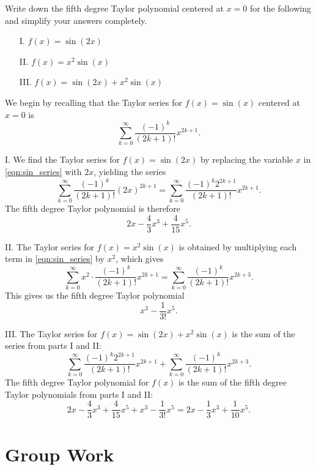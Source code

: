 \documentclass[]{ximera}
\begin{document}
\begin{problem} 
Write down the fifth degree Taylor polynomial centered at $x=0$ for the following and simplify your answers completely.  

\begin{itemize}
\item[I.]  $f(x) = \sin(2x)$
\item[II.] $f(x) = x^2 \sin(x)$
\item[III.] $f(x) = \sin(2x)+ x^2 \sin(x)$
\end{itemize}

\begin{solution}
We begin by recalling that the Taylor series for $f(x)=\sin(x)$ centered at $x=0$ is 
\begin{equation}\label{eqn:sin_series}
\sum_{k=0}^\infty \frac{(-1)^k}{(2k+1)!} x^{2k+1}.
\end{equation}

I. We find the Taylor series for $f(x) = \sin(2x)$ by replacing the variable $x$ in \eqref{eqn:sin_series} with $2x$, yielding the series
$$
\sum_{k=0}^\infty \frac{(-1)^k}{(2k+1)!} (2x)^{2k+1} = \sum_{k=0}^\infty \frac{(-1)^k2^{2k+1}}{(2k+1)!} x^{2k+1}.
$$
The fifth degree Taylor polynomial is therefore
$$
2x - \frac{4}{3}x^3 + \frac{4}{15} x^5.
$$

II. The Taylor series for $f(x) = x^2 \sin(x)$ is obtained by multiplying each term in \eqref{eqn:sin_series} by $x^2$, which gives
$$
\sum_{k=0}^\infty x^2 \cdot \frac{(-1)^k}{(2k+1)!} x^{2k+1} = \sum_{k=0}^\infty \frac{(-1)^k}{(2k+1)!} x^{2k+3}.
$$
This gives us the fifth degree Taylor polynomial
$$
x^3 - \frac{1}{3!} x^5.
$$

III. The Taylor series for $f(x) = \sin(2x)+ x^2 \sin(x)$ is the sum of the series from parts I and II:
$$
\sum_{k=0}^\infty \frac{(-1)^k 2^{2k+1}}{(2k+1)!} x^{2k+1} + \sum_{k=0}^\infty \frac{(-1)^k}{(2k+1)!} x^{2k+3}.
$$
The fifth degree Taylor polynomial for $f(x)$ is the sum of the fifth degree Taylor polynomials from parts I and II:
$$
2x - \frac{4}{3}x^3 + \frac{4}{15} x^5 + x^3 - \frac{1}{3!} x^5 = 2x - \frac{1}{3} x^3 + \frac{1}{10} x^5.
$$

\end{solution}
\end{problem}


\section{Group Work}
\end{document}
